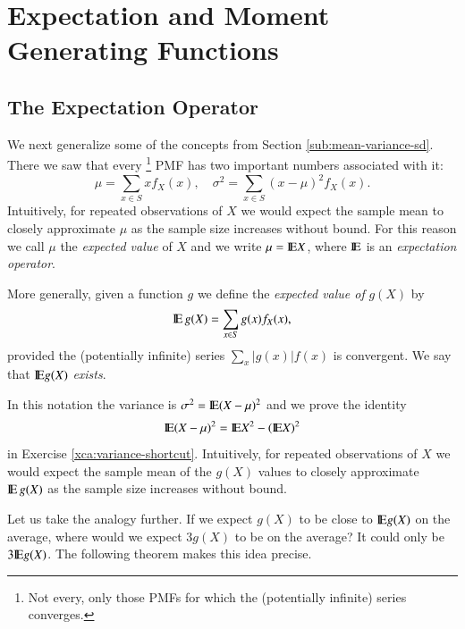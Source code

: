 \documentclass[captions=tableheading]{scrbook}
\begin{document}
\section{Expectation and Moment Generating Functions}
\label{sec-5-4}

\label{sec:expectation-and-mgfs}
\subsection{The Expectation Operator}
\label{sec-5-4-1}

\label{sub:expectation-operator}

We next generalize some of the concepts from Section \ref{sub:mean-variance-sd}. There we saw that every
\footnote{Not every, only those PMFs for which the (potentially infinite) series converges.}
PMF has two important numbers associated with it:
\begin{equation}
\mu=\sum_{x\in S}xf_{X}(x),\quad\sigma^{2}=\sum_{x\in S}(x-\mu)^{2}f_{X}(x).
\end{equation}
Intuitively, for repeated observations of \(X\) we would expect the sample mean to closely approximate \(\mu\) as the sample size increases without bound. For this reason we call \(\mu\) the \emph{expected value} of \(X\) and we write \(\mu=\mathrm{I\hspace{-1.5pt}E} X\), where \(\mathrm{I\hspace{-1.5pt}E}\) is an \emph{expectation operator}.

\begin{defn}
More generally, given a function \(g\) we define the \emph{expected value of} \(g(X)\) by
\begin{equation}
\mathrm{I\hspace{-1.5pt}E}\, g(X)=\sum_{x\in S}g(x)f_{X}(x),
\end{equation}
provided the (potentially infinite) series \(\sum_{x}|g(x)|f(x)\) is convergent. We say that \(\mathrm{I\hspace{-1.5pt}E} g(X)\) \emph{exists}.
\end{defn}


In this notation the variance is \(\sigma^{2}=\mathrm{I\hspace{-1.5pt}E}(X-\mu)^{2}\) and we prove the identity
\begin{equation}
\mathrm{I\hspace{-1.5pt}E}(X-\mu)^{2}=\mathrm{I\hspace{-1.5pt}E} X^{2}-(\mathrm{I\hspace{-1.5pt}E} X)^{2}
\end{equation}
in Exercise \ref{xca:variance-shortcut}. Intuitively, for repeated observations of \(X\) we would expect the sample mean of the \(g(X)\) values to closely approximate \(\mathrm{I\hspace{-1.5pt}E}\, g(X)\) as the sample size increases without bound.

Let us take the analogy further. If we expect \(g(X)\) to be close to \(\mathrm{I\hspace{-1.5pt}E} g(X)\) on the average, where would we expect \(3g(X)\) to be on the average? It could only be \(3\mathrm{I\hspace{-1.5pt}E} g(X)\). The following theorem makes this idea precise.
\end{document}

